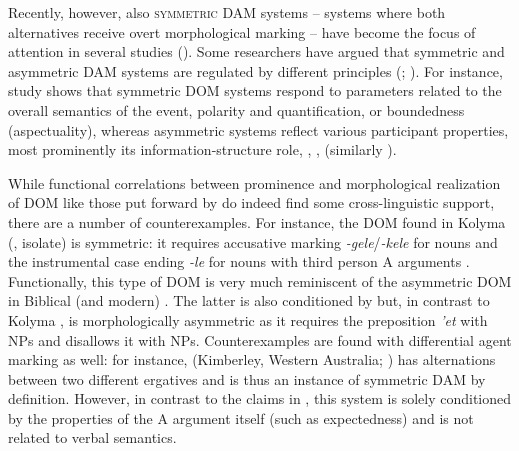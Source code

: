 \documentclass[output=paper]{LSP/langsci}
\begin{document}
Recently, however, also \textsc{symmetric} DAM systems – \ie systems where both alternatives receive overt morphological marking – have become the focus of attention in several studies (\eg \citealt{Hoopetal2008Case-marking, Iemmolo2013Symmetric}). 
Some researchers have argued that symmetric and asymmetric DAM systems are regulated by different principles (\citealt[19]{Dalrympleetal2011Objects}; \citealt{Abrahametal2012Case, Iemmolo2013Symmetric}). 
For instance,  study shows that symmetric DOM systems respond to parameters related to the overall semantics of the event, \eg polarity and quantification,  or boundedness (aspectuality), whereas asymmetric systems reflect various participant properties, most prominently its information-structure role, , , \etc (similarly \citealt[320]{Abrahametal2012Case}). 

While functional correlations between prominence and morphological realization of DOM like those put forward by \citet{Iemmolo2013Symmetric} do indeed find some cross-linguistic support, there are a number of counterexamples. 
For instance, the DOM found in Kolyma  (, isolate) is symmetric: it requires accusative marking \textit{-gele}/\textit{-kele} for  nouns and the instrumental case ending \textit{-le} for  nouns with third person A arguments \citep[93]{Maslova2003Information}. 
Functionally, this type of DOM is very much reminiscent of the asymmetric DOM in Biblical (and modern) . 
The latter is also conditioned by  but, in contrast to Kolyma , is morphologically asymmetric as it requires the preposition \textit{’et} with  NPs and disallows it with  NPs. 
Counterexamples are found with differential agent marking as well: for instance,  (Kimberley, Western Australia; \citealt{McGregor2006Focal}) has alternations between two different ergatives and is thus an instance of symmetric DAM by definition. 
However, in contrast to the claims \eg in \citet{Iemmolo2013Symmetric}, this system is solely conditioned by the properties of the A argument itself (such as expectedness) and is not related to verbal semantics.
\end{document}

